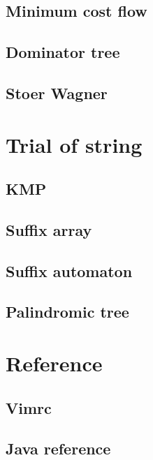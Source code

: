 \documentclass[UTF8,a4paper]{report}
\begin{document}
		\section{Minimum cost flow}
			
		\section{Dominator tree}
			
		\section{Stoer Wagner}
			
	\chapter{Trial of string}
		\section{KMP}
			
		\section{Suffix array}
			
		\section{Suffix automaton}
			
		\section{Palindromic tree}
			
	\chapter{Reference}
		\section{Vimrc}
			
		\section{Java reference}
			
\end{document}
